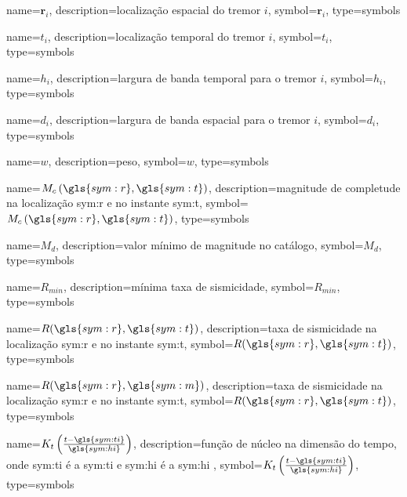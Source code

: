 {
	name={\ensuremath{\boldsymbol{r}_i}},
	description={localização espacial do tremor $i$},
	symbol={\ensuremath{\boldsymbol{r}_i}},
	type=symbols
}


{
	name={\ensuremath{t_i}},
	description={localização temporal do tremor $i$},
	symbol={\ensuremath{t_i}},
	type=symbols
}


{
	name={\ensuremath{h_i}},
	description={largura de banda temporal para o tremor $i$},
	symbol={\ensuremath{h_i}},
	type=symbols
}


{
	name={\ensuremath{d_i}},
	description={largura de banda espacial para o tremor $i$},
	symbol={\ensuremath{d_i}},
	type=symbols
}


{
	name={\ensuremath{ w }},
	description={peso},
	symbol={\ensuremath{ w }},
	type=symbols
}


{
	name={\ensuremath{ M_c\left( \gls{sym:r}, \gls{sym:t} \right)  }},
	description={magnitude de completude na localização \gls{sym:r} e no instante \gls{sym:t}},
	symbol={\ensuremath{ M_c\left( \gls{sym:r}, \gls{sym:t} \right) }},
	type=symbols
}

{
	name={\ensuremath{M_d}},
	description={valor mínimo de magnitude no catálogo},
	symbol={\ensuremath{M_d}},
	type=symbols
}


{
	name={\ensuremath{R_{min}}},
	description={mínima taxa de sismicidade},
	symbol={\ensuremath{R_{min}}},
	type=symbols
}


{
	name={\ensuremath{R(\gls{sym:r},\gls{sym:t})}},
	description={taxa de sismicidade na localização \gls{sym:r} e no instante \gls{sym:t}},
	symbol={\ensuremath{R(\gls{sym:r},\gls{sym:t})}},
	type=symbols
}


{
	name={\ensuremath{R(\gls{sym:r},\gls{sym:m})}},
	description={taxa de sismicidade na localização \gls{sym:r} e no instante \gls{sym:t}},
	symbol={\ensuremath{R(\gls{sym:r},\gls{sym:t})}},
	type=symbols
}


{
	name={\ensuremath{K_t \left( \frac{ t - \gls{sym:ti} }{ \gls{sym:hi} } \right) }},
	description={função de núcleo na dimensão do tempo, onde
					\gls{sym:ti} é a \glsdesc{sym:ti} e
					\gls{sym:hi} é a \glsdesc{sym:hi}
				},
	symbol={\ensuremath{K_t \left( \frac{ t - \gls{sym:ti} }{ \gls{sym:hi} } \right)}},
	type=symbols
}

